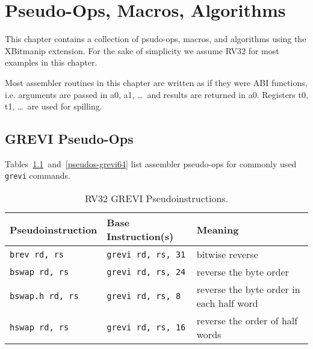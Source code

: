 \chapter{Pseudo-Ops, Macros, Algorithms}

This chapter contains a collection of psudo-ops, macros, and algorithms using
the XBitmanip extension. For the sake of simplicity we assume RV32 for most
examples in this chapter.

Most assembler routines in this chapter are written as if they were ABI functions,
i.e. arguments are passed in a0, a1, \dots\ and results are returned in a0. Registers
t0, t1, \dots\ are used for spilling.

\section{GREVI Pseudo-Ops}

Tables~\ref{pseudos-grevi32}~and~\ref{pseudos-grevi64} list assembler
pseudo-ops for commonly used {\tt grevi} commands.

\begin{table}[h]
\begin{small}
\begin{center}
\begin{tabular}{l l l}
Pseudoinstruction & Base Instruction(s) & Meaning \\ \hline

{\tt brev rd, rs} & {\tt grevi rd, rs, 31} & bitwise reverse \\
{\tt bswap rd, rs} & {\tt grevi rd, rs, 24} & reverse the byte order \\
{\tt bswap.h rd, rs} & {\tt grevi rd, rs, 8} & reverse the byte order in each half word \\
{\tt hswap rd, rs} & {\tt grevi rd, rs, 16} & reverse the order of half words \\

\hline

\end{tabular}
\end{center}
\end{small}
\caption{RV32 GREVI Pseudoinstructions.}
\label{pseudos-grevi32}
\end{table}

